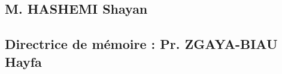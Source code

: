 \documentclass[
]{article}
\begin{document}
\hypertarget{section-4}{%
\subsection{}\label{section-4}}

\hypertarget{section-5}{%
\subsection{}\label{section-5}}

\hypertarget{section-6}{%
\subsection{}\label{section-6}}

\hypertarget{section-7}{%
\subsection{}\label{section-7}}

\hypertarget{m.-hashemi-shayan}{%
\subsection{M. HASHEMI Shayan}\label{m.-hashemi-shayan}}

\hypertarget{directrice-de-muxe9moire-pr.-zgaya-biau-hayfa}{%
\subsection{\texorpdfstring{Directrice de mémoire : Pr. ZGAYA-BIAU Hayfa }{Directrice de mémoire : Pr. ZGAYA-BIAU Hayfa }}\label{directrice-de-muxe9moire-pr.-zgaya-biau-hayfa}}

\hypertarget{section-8}{%
\subsection{}\label{section-8}}

\hypertarget{section-9}{%
\subsection{}\label{section-9}}

\hypertarget{section-10}{%
\subsection{}\label{section-10}}

\hypertarget{section-11}{%
\subsection{}\label{section-11}}
\end{document}
